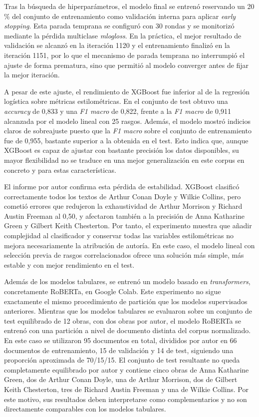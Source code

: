 \documentclass[IB]{TFUOC}%
\begin{document}
Tras la búsqueda de hiperparámetros, el modelo final se entrenó reservando un 20 \% del conjunto de entrenamiento como validación interna para aplicar \textit{early stopping}. Esta parada temprana se configuró con 30 rondas y se monitorizó mediante la pérdida multiclase \textit{mlogloss}. En la práctica, el mejor resultado de validación se alcanzó en la iteración 1120 y el entrenamiento finalizó en la iteración 1151, por lo que el mecanismo de parada temprana no interrumpió el ajuste de forma prematura, sino que permitió al modelo converger antes de fijar la mejor iteración.

A pesar de este ajuste, el rendimiento de XGBoost fue inferior al de la regresión logística sobre métricas estilométricas. En el conjunto de test obtuvo una \textit{accuracy} de 0,833 y una \textit{F1 macro} de 0,822, frente a la \textit{F1 macro} de 0,911 alcanzada por el modelo lineal con 25 rasgos. Además, el modelo mostró indicios claros de sobreajuste puesto que la \textit{F1 macro} sobre el conjunto de entrenamiento fue de 0,955, bastante superior a la obtenida en el test. Esto indica que, aunque XGBoost es capaz de ajustar con bastante precisión los datos disponibles, su mayor flexibilidad no se traduce en una mejor generalización en este corpus en concreto y para estas características.

El informe por autor confirma esta pérdida de estabilidad. XGBoost clasificó correctamente todos los textos de Arthur Conan Doyle y Wilkie Collins, pero cometió errores que redujeron la exhaustividad de Arthur Morrison y Richard Austin Freeman al 0,50, y afectaron también a la precisión de Anna Katharine Green y Gilbert Keith Chesterton. Por tanto, el experimento muestra que añadir complejidad al clasificador y conservar todas las variables estilométricas no mejora necesariamente la atribución de autoría. En este caso, el modelo lineal con selección previa de rasgos correlacionados ofrece una solución más simple, más estable y con mejor rendimiento en el test.

Además de los modelos tabulares, se entrenó un modelo basado en \textit{transformers}, concretamente RoBERTa, en Google Colab. Este experimento no sigue exactamente el mismo procedimiento de partición que los modelos supervisados anteriores. Mientras que los modelos tabulares se evaluaron sobre un conjunto de test equilibrado de 12 obras, con dos obras por autor, el modelo RoBERTa se entrenó con una partición a nivel de documento distinta del corpus normalizado. En este caso se utilizaron 95 documentos en total, divididos por autor en 66 documentos de entrenamiento, 15 de validación y 14 de test, siguiendo una proporción aproximada de 70/15/15. El conjunto de test resultante no queda completamente equilibrado por autor y contiene cinco obras de Anna Katharine Green, dos de Arthur Conan Doyle, una de Arthur Morrison, dos de Gilbert Keith Chesterton, tres de Richard Austin Freeman y una de Wilkie Collins. Por este motivo, sus resultados deben interpretarse como complementarios y no son directamente comparables con los modelos tabulares.
\end{document}
